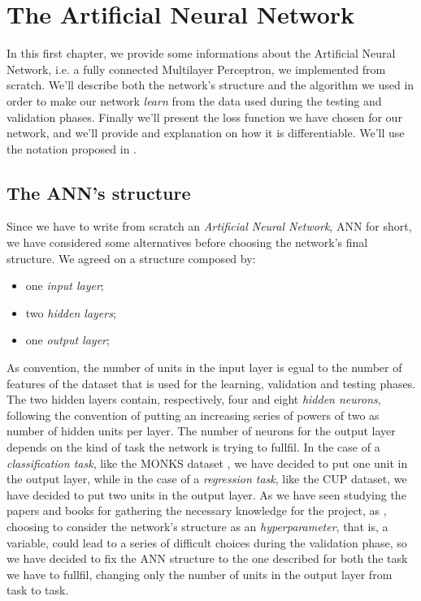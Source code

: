\chapter{The Artificial Neural Network} %
\label{cha:the_artificial_neural_network}
	In this first chapter, we provide some informations about the Artificial Neural Network, i.e. a fully
	connected Multilayer Perceptron, we implemented from scratch. We'll describe both the network's structure and
	the algorithm we used in order to make our network \textit{learn} from the data used during the testing and
	validation phases. Finally we'll present the loss function we have chosen for our network, and we'll provide
	and explanation on how it is differentiable. We'll use the notation proposed in \cite{Goodfellow-et-al-2016}.

	\section{The ANN's structure} %
	\label{sec:the_ann_s_structure}
		Since we have to write from scratch an \textit{Artificial Neural Network}, ANN for short, we have
		considered some alternatives before choosing the network's final structure. We agreed on a structure
		composed by:

		\begin{itemize}
			\item one \textit{input layer};
			\item two \textit{hidden layers};
			\item one \textit{output layer};
		\end{itemize}

		As convention, the number of units in the input layer is egual to the number
		of features of the dataset that is used for the learning, validation and testing phases. The two
		hidden layers contain, respectively, four and eight \textit{hidden neurons}, following the convention of
		putting an increasing series of powers of two as number of hidden units per layer. The number of neurons
		for the output layer depends on the kind of task the network is trying to fullfil. In the case of a
		\textit{classification task}, like the MONKS dataset \cite{Dua:2019}, we have decided to put one unit in
		the output layer, while in the case of a \textit{regression task}, like the CUP dataset, we have decided to
		put two units in the output layer. As we have seen studying the papers and books for gathering the
		necessary knowledge for the project, as \cite{Goodfellow-et-al-2016,haykin2009neural,mitchell1997machine},
		choosing to consider the network's structure as an \textit{hyperparameter}, that is, a variable, could
		lead to a series of difficult choices during the validation phase, so we have decided to fix the ANN
		structure to the one described for both the task we have to fullfil, changing only the number of units in
		the output layer from task to task.


